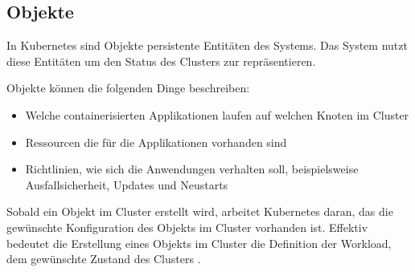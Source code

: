 \subsection{Objekte}
\label{sec:kubernetes:objekte}
In Kubernetes sind Objekte persistente Entitäten des Systems. 
Das System nutzt diese Entitäten um den Status des Clusters zur repräsentieren.

Objekte können die folgenden Dinge beschreiben:
\begin{itemize}
  \item Welche containerisierten Applikationen laufen auf welchen Knoten im Cluster
  \item Ressourcen die für die Applikationen vorhanden sind
  \item Richtlinien, wie sich die Anwendungen verhalten soll, beispielsweise Ausfallsicherheit, Updates und Neustarts
\end{itemize}

Sobald ein Objekt im Cluster erstellt wird, arbeitet Kubernetes daran, das die gewünschte Konfiguration des Objekts
im Cluster vorhanden ist. 
Effektiv bedeutet die Erstellung eines Objekts im Cluster die Definition der Workload, dem gewünschte Zustand des Clusters \cite{KuberneteObjects_2021}.
